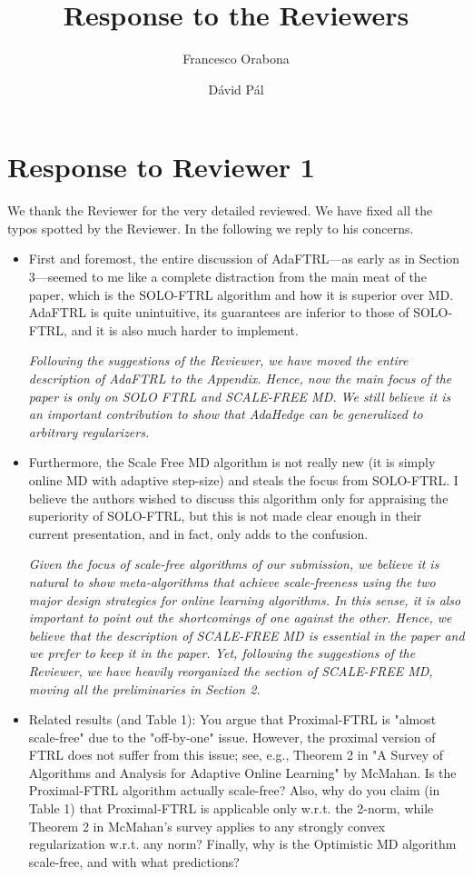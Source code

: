 \documentclass{article}
\author{Francesco Orabona
\and
D\'avid P\'al}
\title{Response to the Reviewers}
\begin{document}
\maketitle

\section{Response to Reviewer 1} 

We thank the Reviewer for the very detailed reviewed. We have fixed all the typos spotted by the Reviewer. In the following we reply to his concerns.

\begin{itemize}
\item First and foremost, the entire discussion of AdaFTRL---as early as in Section 3---seemed to me like a complete distraction from the main meat of the paper, which is the SOLO-FTRL algorithm and how it is superior over MD.  AdaFTRL is quite unintuitive, its guarantees are inferior to those of SOLO-FTRL, and it is also much harder to implement.

\emph{Following the suggestions of the Reviewer, we have moved the entire description of AdaFTRL to the Appendix. Hence, now the main focus of the paper is only on SOLO FTRL and SCALE-FREE MD. We still believe it is an important contribution to show that AdaHedge can be generalized to arbitrary regularizers.}

\item Furthermore, the Scale Free MD algorithm is not really new (it is simply online MD with adaptive step-size) and steals the focus from SOLO-FTRL.  I believe the authors wished to discuss this algorithm only for appraising the superiority of SOLO-FTRL, but this is not made clear enough in their current presentation, and in fact, only adds to the confusion.

\emph{Given the focus of scale-free algorithms of our submission, we believe it is natural to show meta-algorithms that achieve scale-freeness using the two major design strategies for online learning algorithms. In this sense, it is also important to point out the shortcomings of one against the other. Hence, we believe that the description of SCALE-FREE MD is essential in the paper and we prefer to keep it in the paper. Yet, following the suggestions of the Reviewer, we have heavily reorganized the section of SCALE-FREE MD, moving all the preliminaries in Section 2.}

\item Related results (and Table 1): You argue that Proximal-FTRL is "almost
scale-free" due to the "off-by-one" issue.  However, the proximal version of
FTRL does not suffer from this issue; see, e.g., Theorem 2 in "A Survey of
Algorithms and Analysis for Adaptive Online Learning" by McMahan.  Is the
Proximal-FTRL algorithm actually scale-free?  Also, why do you claim (in Table
1) that Proximal-FTRL is applicable only w.r.t. the 2-norm, while Theorem 2 in
McMahan's survey applies to any strongly convex regularization w.r.t. any norm?
Finally, why is the Optimistic MD algorithm scale-free, and with what
predictions?


\end{itemize}
\end{document}
